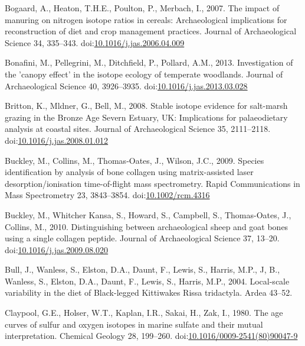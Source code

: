 \documentclass[review]{elsarticle} %
\newlength{\cslhangindent}
\newenvironment{CSLReferences}[2] %
 {%
  \setlength{\parindent}{0pt}
  \ifodd #1 \everypar{\setlength{\hangindent}{\cslhangindent}}\ignorespaces\fi
  \ifnum #2 > 0
  \setlength{\parskip}{#2\baselineskip}
  \fi
 }%
 {}
\begin{document}
\begin{CSLReferences}{1}{0}
\leavevmode{}%
Bogaard, A., Heaton, T.H.E., Poulton, P., Merbach, I., 2007. The impact of manuring on nitrogen isotope ratios in cereals: Archaeological implications for reconstruction of diet and crop management practices. Journal of Archaeological Science 34, 335--343. doi:\href{https://doi.org/10.1016/j.jas.2006.04.009}{10.1016/j.jas.2006.04.009}

\leavevmode{}%
Bonafini, M., Pellegrini, M., Ditchfield, P., Pollard, A.M., 2013. Investigation of the 'canopy effect' in the isotope ecology of temperate woodlands. Journal of Archaeological Science 40, 3926--3935. doi:\href{https://doi.org/10.1016/j.jas.2013.03.028}{10.1016/j.jas.2013.03.028}

\leavevmode{}%
Britton, K., Mldner, G., Bell, M., 2008. Stable isotope evidence for salt-marsh grazing in the {Bronze Age Severn Estuary}, {UK}: Implications for palaeodietary analysis at coastal sites. Journal of Archaeological Science 35, 2111--2118. doi:\href{https://doi.org/10.1016/j.jas.2008.01.012}{10.1016/j.jas.2008.01.012}

\leavevmode{}%
Buckley, M., Collins, M., Thomas‐Oates, J., Wilson, J.C., 2009. Species identification by analysis of bone collagen using matrix-assisted laser desorption/ionisation time-of-flight mass spectrometry. Rapid Communications in Mass Spectrometry 23, 3843--3854. doi:\href{https://doi.org/10.1002/rcm.4316}{10.1002/rcm.4316}

\leavevmode{}%
Buckley, M., Whitcher Kansa, S., Howard, S., Campbell, S., Thomas-Oates, J., Collins, M., 2010. Distinguishing between archaeological sheep and goat bones using a single collagen peptide. Journal of Archaeological Science 37, 13--20. doi:\href{https://doi.org/10.1016/j.jas.2009.08.020}{10.1016/j.jas.2009.08.020}

\leavevmode{}%
Bull, J., Wanless, S., Elston, D.A., Daunt, F., Lewis, S., Harris, M.P., J, B., Wanless, S., Elston, D.A., Daunt, F., Lewis, S., Harris, M.P., 2004. Local-scale variability in the diet of {Black}-legged {Kittiwakes Rissa} tridactyla. Ardea 43--52.

\leavevmode{}%
Claypool, G.E., Holser, W.T., Kaplan, I.R., Sakai, H., Zak, I., 1980. The age curves of sulfur and oxygen isotopes in marine sulfate and their mutual interpretation. Chemical Geology 28, 199--260. doi:\href{https://doi.org/10.1016/0009-2541(80)90047-9}{10.1016/0009-2541(80)90047-9}


\end{CSLReferences}
\end{document}

